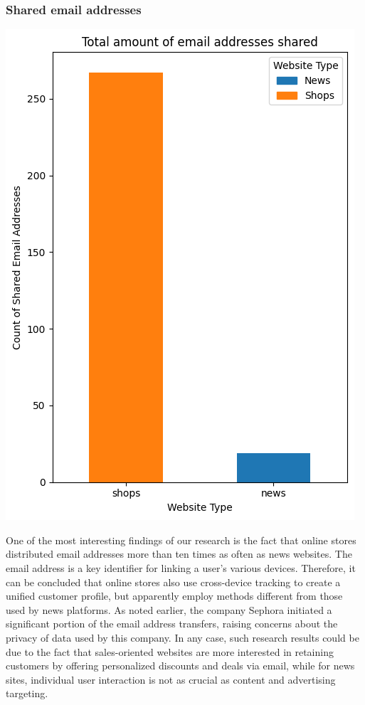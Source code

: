 \subsubsection{Shared email addresses}
\noindent 
\begin{minipage}{0.4\textwidth} 
    \includegraphics[width=\linewidth]{./assets/comparison3.png} 
\end{minipage}
\hfill 
\begin{minipage}{0.5\textwidth} 
    One of the most interesting findings of our research is the fact that online stores distributed email addresses more than ten times as often as news websites. The email address is a key identifier for linking a user's various devices. Therefore, it can be concluded that online stores also use cross-device tracking to create a unified customer profile, but apparently employ methods different from those used by news platforms. As noted earlier, the company Sephora initiated a significant portion of the email address transfers, raising concerns about the privacy of data used by this company. In any case, such research results could be due to the fact that sales-oriented websites are more interested in retaining customers by offering personalized discounts and deals via email, while for news sites, individual user interaction is not as crucial as content and advertising targeting.
\end{minipage}

